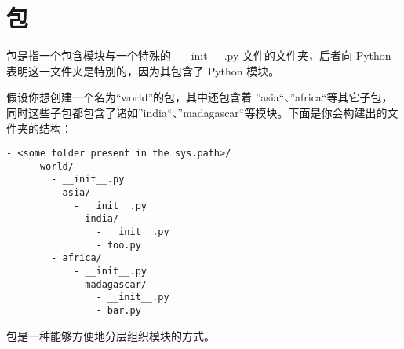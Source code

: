 \section{包} %
\label{sec:包}
包是指一个包含模块与一个特殊的 \_\_init\_\_.py 文件的文件夹，后者向 Python 表明这一文件夹是特别的，因为其包含了 Python 模块。

假设你想创建一个名为“world”的包，其中还包含着 ”asia“、”africa“等其它子包，同时这些子包都包含了诸如”india“、”madagascar“等模块。下面是你会构建出的文件夹的结构：

\begin{lstlisting}
- <some folder present in the sys.path>/
    - world/
        - __init__.py
        - asia/
            - __init__.py
            - india/
                - __init__.py
                - foo.py
        - africa/
            - __init__.py
            - madagascar/
                - __init__.py
                - bar.py
\end{lstlisting}

包是一种能够方便地分层组织模块的方式。
